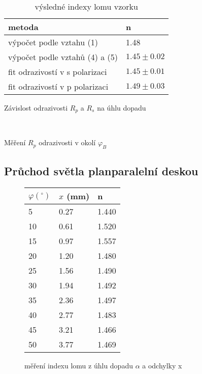 \documentclass[a4paper,11pt]{article}
\begin{document}
\begin{table}[htpb]
    \centering
    \begin{tabular}{ll}
    \hline \hline
    metoda & n \\ \hline
    výpočet podle vztahu (1) & 1.48 \\
    výpočet podle vztahů (4) a (5) & $1.45 \pm 0.02$ \\
    fit odrazivostí v s polarizaci & $1.45 \pm 0.01$ \\
    fit odrazivostí v p polarizaci & $1.49 \pm 0.03$ \\
    \hline \hline
    \end{tabular}
    \caption{výsledné indexy lomu vzorku}
\end{table}

\vspace{-30pt}

\begin{table}[htpb]
    \begin{minipage}[b]{.54\linewidth}
        \centering
        \resizebox{\textwidth}{!}{  }
        \captionsetup{type=graph}
        \caption{Závislost odrazivosti $ R_p $ a $ R_s $ na úhlu dopadu}
    \end{minipage} 
    \hfill
    \begin{minipage}[b]{.42\linewidth}
        \centering
        \resizebox{\textwidth}{!}{  } \\
    \captionsetup{type=graph}
    \caption{Měření $ R_p $ odrazivosti v okolí $ \varphi_B $}
    \end{minipage} 
\end{table}

\subsection{Průchod světla planparalelní deskou}

\begin{wrapfigure}[13]{tr}{0.44\textwidth}
    \vspace{-25pt}
    \centering
    \begin{tabular}{l l l}
        \hline\hline
        $ \varphi (^{\circ}) $ & $ x $ (mm) & n \\
        \hline
        5  & 0.27 & 1.440 \\
        10 & 0.61 & 1.520 \\
        15 & 0.97 & 1.557 \\
        20 & 1.20 & 1.480 \\
        25 & 1.56 & 1.490 \\
        30 & 1.94 & 1.492 \\
        35 & 2.36 & 1.497 \\
        40 & 2.77 & 1.483 \\
        45 & 3.21 & 1.466 \\
        50 & 3.77 & 1.469 \\
        \hline\hline
    \end{tabular}
    \captionsetup{type=table}
    \caption{měření indexu lomu z úhlu dopadu $ \alpha $ a odchylky x}
\end{wrapfigure}
\end{document}
